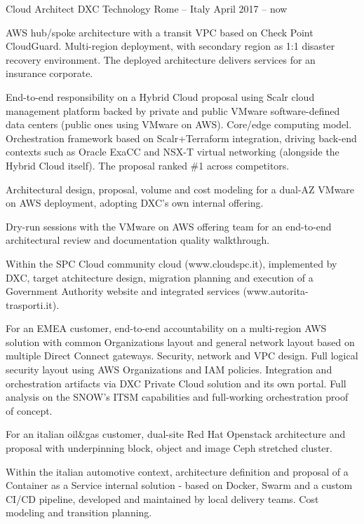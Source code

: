 
\begin{cventries}

  \cventry
    {Cloud Architect} %
    {DXC Technology} %
    {Rome -- Italy} %
    {April 2017 -- now} %
    {
      \begin{cvitems} %
        \item {AWS hub/spoke architecture with a transit VPC based on Check Point CloudGuard. Multi-region deployment, with secondary region as 1:1 disaster recovery environment. The deployed architecture delivers services for an insurance corporate.}
        \item {End-to-end responsibility on a Hybrid Cloud proposal using Scalr cloud management platform backed by private and public VMware software-defined data centers (public ones using VMware on AWS). Core/edge computing model. Orchestration framework based on Scalr+Terraform integration, driving back-end contexts such as Oracle ExaCC and NSX-T virtual networking (alongside the Hybrid Cloud itself). The proposal ranked \#1 across competitors.}
        \item {Architectural design, proposal, volume and cost modeling for a dual-AZ VMware on AWS deployment, adopting DXC's own internal offering.}
        \item {Dry-run sessions with the VMware on AWS offering team for an end-to-end architectural review and documentation quality walkthrough.}
        \item {Within the SPC Cloud community cloud (www.cloudspc.it), implemented by DXC, target atchitecture design, migration planning and execution of a Government Authority website and integrated services (www.autorita-trasporti.it).}
        \item {For an EMEA customer, end-to-end accountability on a multi-region AWS solution with common Organizations layout and general network layout based on multiple Direct Connect gateways. Security, network and VPC design. Full logical security layout using AWS Organizations and IAM policies. Integration and orchestration artifacts via DXC Private Cloud solution and its own portal. Full analysis on the SNOW's ITSM capabilities and full-working orchestration proof of concept.}
        \item {For an italian oil\&gas customer, dual-site Red Hat Openstack architecture and proposal with underpinning block, object and image Ceph stretched cluster.}
        \item {Within the italian automotive context, architecture definition and proposal of a Container as a Service internal solution - based on Docker, Swarm and a custom CI/CD pipeline, developed and maintained by local delivery teams. Cost modeling and transition planning.}
      \end{cvitems}
    }


\end{cventries}
